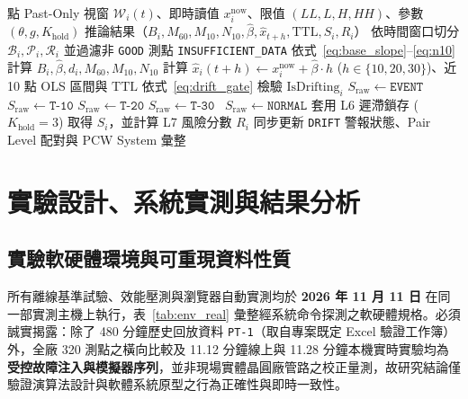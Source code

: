 \documentclass[fontset=none, a4paper, 12pt]{ctexart}
\begin{document}
\begin{doublespace}
\begin{algorithm}[H]
\caption{統一雙視窗異常密度與七層工業硬化預警演算法 (Unified V1)}
\label{alg:unified_v1}
\begin{algorithmic}[1]
 點 Past-Only 視窗 $\mathcal{W}_i(t)$、即時讀值 $x_i^{\mathrm{now}}$、限值 $(LL, L, H, HH)$、參數 $(\theta, g, K_{\mathrm{hold}})$
\Ensure 推論結果（$B_i, M_{60}, M_{10}, N_{10}, \hat{\beta}, \hat{x}_{t+h}, \mathrm{TTL}, S_i, R_i$）
\State 依時間窗口切分 $\mathcal{B}_i, \mathcal{P}_i, \mathcal{R}_i$ 並過濾非 \texttt{GOOD} 測點
    \State \Return \texttt{INSUFFICIENT\_DATA} 
\EndIf
\State 依式~\eqref{eq:base_slope}--\eqref{eq:n10} 計算 $B_i, \hat{\beta}, d_i, M_{60}, M_{10}, N_{10}$
\State 計算 $\hat{x}_i(t+h) \leftarrow x_i^{\mathrm{now}} + \hat{\beta}\cdot h$ ($h\in\{10,20,30\}$)、近 10 點 OLS 區間與 $\mathrm{TTL}$ 
\State 依式~\eqref{eq:drift_gate} 檢驗 $\mathrm{IsDrifting}_i$ 
    \State $S_{\mathrm{raw}} \leftarrow \texttt{EVENT}$ 
 $S_{\mathrm{raw}} \leftarrow \texttt{T-10}$
 $S_{\mathrm{raw}} \leftarrow \texttt{T-20}$
 $S_{\mathrm{raw}} \leftarrow \texttt{T-30}$
\Else\ $S_{\mathrm{raw}} \leftarrow \texttt{NORMAL}$
\EndIf
\State 套用 L6 遲滯鎖存 ($K_{\mathrm{hold}}=3$) 取得 $S_i$，並計算 L7 風險分數 $R_i$
\State 同步更新 \texttt{DRIFT} 警報狀態、Pair Level 配對與 PCW System 彙整
\end{algorithmic}
\end{algorithm}

\clearpage
\section{實驗設計、系統實測與結果分析}

\subsection{實驗軟硬體環境與可重現資料性質}
所有離線基準試驗、效能壓測與瀏覽器自動實測均於 \textbf{2026 年 11 月 11 日} 在同一部實測主機上執行，表~\ref{tab:env_real} 彙整經系統命令探測之軟硬體規格。必須誠實揭露：除了 480 分鐘歷史回放資料 \texttt{PT-1}（取自專案既定 Excel 驗證工作簿）外，全廠 320 測點之橫向比較及 11.12 分鐘線上與 11.28 分鐘本機實時實驗均為\textbf{受控故障注入與模擬器序列}，並非現場實體晶圓廠管路之校正量測，故研究結論僅驗證演算法設計與軟體系統原型之行為正確性與即時一致性。


\end{doublespace}
\end{document}
